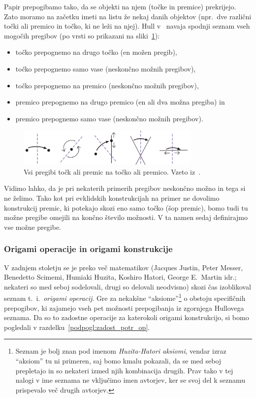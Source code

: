 Papir prepogibamo tako, da se objekti na njem (točke in premice) prekrijejo. Zato moramo na začetku imeti na listu že nekaj danih objektov (npr.\ dve različni točki ali premico in točko, ki ne leži na njej). Hull v~\cite[str.\ 24--26]{hull2020} navaja spodnji seznam vseh mogočih pregibov (po vrsti so prikazani na sliki~\ref{fig:vsi_pregibi}):
\begin{itemize}
    \item točko prepognemo na drugo točko (en možen pregib),
    \item točko prepognemo samo vase (neskončno možnih pregibov),
    \item točko prepognemo na premico (neskončno možnih pregibov),
    \item premico prepognemo na drugo premico (en ali dva možna pregiba) in
    \item premico prepognemo samo vase (neskončno možnih pregibov).
\end{itemize}

\begin{figure}[h]
    \centering
    \includegraphics[width=0.8\textwidth]{images/hull_vsi pregibi.png}
    \caption[Vsi mogoči pregibi]{Vsi pregibi točk ali premic na točko ali premico. Vzeto iz~\cite[str.\ 25]{hull2020}.}
    \label{fig:vsi_pregibi}
\end{figure}

Vidimo lahko, da je pri nekaterih primerih pregibov neskončno možno in tega si ne želimo. Tako kot pri evklidskih konstrukcijah na primer ne dovolimo konstrukcij premic, ki potekajo skozi eno samo točko (šop premic), bomo tudi tu možne pregibe omejili na končno število možnosti. V ta namen sedaj definirajmo vse možne pregibe.

\subsubsection{Origami operacije in origami konstrukcije}
\label{podpodpogl:operacije}

V zadnjem stoletju se je preko več matematikov (Jacques Justin, Peter Messer, Benedetto Scimemi, Humiaki Huzita, Koshiro Hatori, George E.\ Martin idr.; nekateri so med seboj sodelovali, drugi so delovali neodvisno) skozi čas izoblikoval seznam t.~i.\ \emph{origami operacij}. Gre za nekakšne ``aksiome''\footnote{Seznam je bolj znan pod imenom \emph{Huzita-Hatori aksiomi}, vendar izraz ``aksiom'' tu ni primeren, saj bomo kmalu pokazali, da se med seboj prepletajo in so nekateri izmed njih kombinacija drugih. Prav tako v tej nalogi v ime seznama ne vključimo imen avtorjev, ker se svoj del k seznamu prispevalo več drugih avtorjev.} o obstoju specifičnih prepogibov, ki zajamejo vseh pet možnosti prepogibanja iz zgornjega Hullovega seznama. Da so to zadostne operacije za katerokoli origami konstrukcijo, si bomo pogledali v razdelku~\ref{podpogl:zadost_potr_op}.

